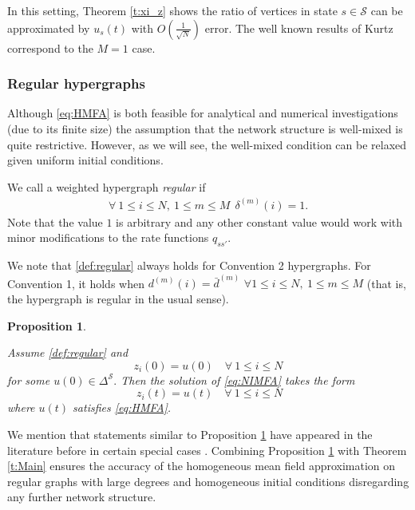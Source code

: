 \documentclass{article}
\newcommand{\1}[1]{{\mathds{1}}_{\left\{#1\right\}}}
\renewcommand{\S}{\mathcal{S}}
\newtheorem{prop}{Proposition}
\begin{document}
	
	In this setting, Theorem \ref{t:xi_z} shows the ratio of vertices in state $s \in \mathcal{S}$ can be approximated by $u_s(t)$ with $O \left( \frac{1}{\sqrt{N}} \right)$ error. The well known results of Kurtz \cite{kurtz70, kurtz78} correspond to the $M=1$ case.
	
	\subsubsection*{Regular hypergraphs}
	
	Although \eqref{eq:HMFA} is both feasible for analytical and numerical investigations (due to its finite size) the assumption that the network structure is well-mixed is quite restrictive. However, as we will see, the well-mixed condition can be relaxed given uniform initial conditions.
	
	We call a weighted hypergraph \emph{regular} if
	\begin{align}
		\label{def:regular}
		\forall \ 1 \leq i \leq N, \ 1 \leq m \leq M  \ \ \delta^{(m)}(i)=1.
	\end{align}
	Note that the value $1$ is arbitrary and any other constant value would work with minor modifications to the rate functions $q_{ss'}$.
	
	We note that \eqref{def:regular} always holds for Convention 2 hypergraphs. For Convention 1, it holds when $d^{(m)}(i)=\bar{d}^{(m)}\,\, \forall 1 \leq i \leq N, \ 1 \leq m \leq M$  (that is, the hypergraph is regular in the usual sense).
	
	\begin{prop}
		\label{p:uniform}
		
		Assume \eqref{def:regular} and
		$$ z_{i}(0)=u(0)\quad \forall \ 1 \leq i \leq N$$ for some $u(0) \in \Delta^{\S}.$ Then the solution of \eqref{eq:NIMFA} takes the form
		$$\ z_{i}(t)=u(t)\quad \forall \ 1 \leq i \leq N $$
		where $u(t)$ satisfies \eqref{eq:HMFA}. 
	\end{prop}
	We mention that statements similar to Proposition \ref{p:uniform} have appeared in the literature before in certain special cases \cite[Proposition 3.18 ]{Simon_book}. Combining Proposition \ref{p:uniform} with Theorem \ref{t:Main} ensures the accuracy of the homogeneous mean field approximation on regular graphs with large degrees and homogeneous initial conditions disregarding any further network structure.
	
\end{document}
